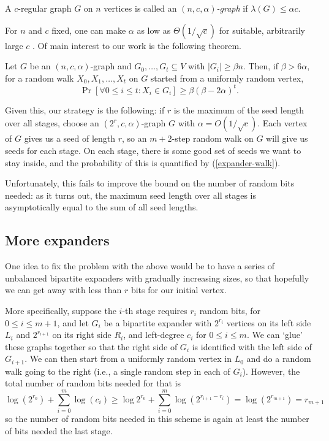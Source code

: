 \begin{definition}
  A $c$-regular graph $G$ on $n$ vertices is called an
  \emph{$(n,c,\alpha)$-graph} if $\lambda(G)\le\alpha c$.
\end{definition}

For $n$ and $c$ fixed, one can make $\alpha$ as low as
$\Theta(1/\sqrt{c})$ for suitable, arbitrarily large $c$
\cite{morgenstern1994existence}. Of main interest to our work is the
following theorem.

\begin{theorem}
  \label{expander-walk}
  Let $G$ be an $(n,c,\alpha)$-graph and $G_0,\ldots,G_t\subseteq V$ with
  $|G_i|\ge \beta n$. Then, if $\beta>6\alpha$, for a random walk
  $X_0,X_1,\ldots,X_t$ on $G$ started from a uniformly random vertex,
  \[
  \Pr[\forall 0\le i\le t: X_i\in G_i] \ge \beta(\beta-2\alpha)^t.
  \]
\end{theorem}

Given this, our strategy is the following: if $r$ is the maximum of
the seed length over all stages, choose an $(2^r,c,\alpha)$-graph $G$
with $\alpha=O(1/\sqrt{c})$. Each vertex of $G$ gives us a seed of
length $r$, so an $m+2$-step random walk on $G$ will give us seeds for
each stage. On each stage, there is some good set of seeds we want to
stay inside, and the probability of this is quantified by
(\ref{expander-walk}).

Unfortunately, this fails to improve the bound on the number of random
bits needed: as it turns out, the maximum seed length over all stages
is asymptotically equal to the sum of all seed lengths.

\subsection{More expanders}

One idea to fix the problem with the above would be to have a series
of unbalanced bipartite expanders with gradually increasing sizes, so
that hopefully we can get away with less than $r$ bits for our initial
vertex.

More specifically, suppose the $i$-th stage requires $r_i$ random
bits, for $0\le i\le m+1$, and let $G_i$ be a bipartite expander with
$2^{r_{i}}$ vertices on its left side $L_i$ and $2^{r_{i+1}}$ on its
right side $R_i$, and left-degree $c_i$ for $0\le i\le m$. We can
`glue' these graphs together so that the right side of $G_i$ is
identified with the left side of $G_{i+1}$. We can then start from a
uniformly random vertex in $L_0$ and do a random walk going to the
right (i.e., a single random step in each of $G_i$). However, the
total number of random bits needed for that is
\[
\log(2^{r_0}) + \sum_{i=0}^m \log(c_i) \ge \log 2^{r_0} + \sum_{i=0}^m
\log(2^{r_{i+1}-r_i}) = \log(2^{r_{m+1}}) = r_{m+1}
\]
so the number of random bits needed in this scheme is again at least
the number of bits needed the last stage.

